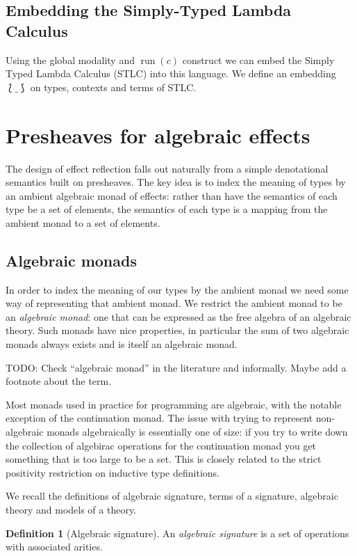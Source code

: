 \documentclass[acmsmall, screen, nonacm]{acmart}
\theoremstyle{definition}
\newtheorem{definition}{Definition}[section]
\newcommand{\grun}[1]{\mathop{\mathrm{run}}(#1)}
\newcommand{\embed}[1]{\lbag #1 \rbag}
\newcommand{\todo}[1]{{\color{red}TODO: #1}}
\begin{document}
\subsection{Embedding the Simply-Typed Lambda Calculus}

Using the global modality and $\grun{c}$ construct we can embed the
Simply Typed Lambda Calculus (STLC) into this language. We define an
embedding $\embed{\_}$ on types, contexts and terms of STLC.

\section{Presheaves for algebraic effects}
\label{sec:semantics}

The design of effect reflection falls out naturally from a simple
denotational semantics built on presheaves. The key idea is to index the
meaning of types by an ambient algebraic monad of effects: rather than
have the semantics of each type be a set of elements, the semantics of
each type is a mapping from the ambient monad to a set of elements.

\subsection{Algebraic monads}

In order to index the meaning of our types by the ambient monad we need
some way of representing that ambient monad. We restrict the ambient
monad to be an \emph{algebraic monad}: one that can be expressed as the
free algebra of an algebraic theory. Such monads have nice properties,
in particular the sum of two algebraic monads always exists and is
itself an algebraic monad.

\todo{Check ``algebraic monad'' in the literature and informally. Maybe
  add a footnote about the term.}

Most monads used in practice for programming are algebraic, with the
notable exception of the continuation monad. The issue with trying to
represent non-algebraic monads algebraically is essentially one of size:
if you try to write down the collection of algebirac operations for the
continuation monad you get something that is too large to be a set. This
is closely related to the strict positivity restriction on inductive
type definitions.

We recall the definitions of algebraic signature, terms of a signature,
algebraic theory and models of a theory.
\begin{definition}[Algebraic signature]
  An \emph{algebraic signature} is a set of operations with associated
  arities.
\end{definition}
\end{document}
